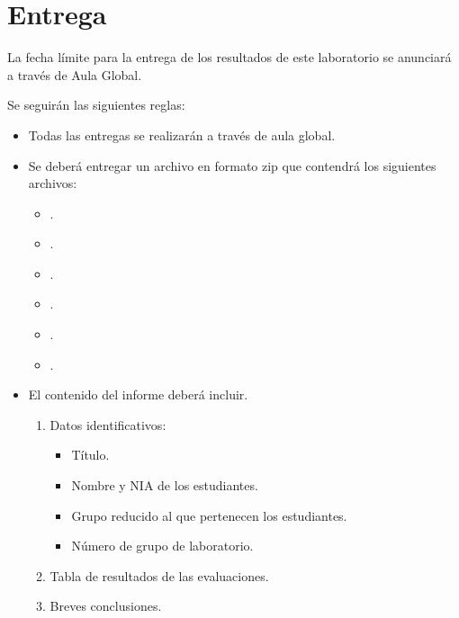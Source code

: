 \clearpage
\section{Entrega}

La fecha límite para la entrega de los resultados de este laboratorio 
se anunciará a través de Aula Global.

Se seguirán las siguientes reglas:

\begin{itemize}

  \item Todas las entregas se realizarán a través de aula global.

  \item Se deberá entregar un archivo en formato zip que contendrá los siguientes archivos:
     \begin{itemize}
       \item {}.
       \item {}.
       \item {}.
       \item {}.
       \item {}.
       \item {}.
     \end{itemize}

  \item El contenido del informe deberá incluir.
  \begin{enumerate}
    \item Datos identificativos:
      \begin{itemize}
        \item Título.
        \item Nombre y NIA de los estudiantes.
        \item Grupo reducido al que pertenecen los estudiantes.
        \item Número de grupo de laboratorio.
      \end{itemize}

    \item Tabla de resultados de las evaluaciones.

    \item Breves conclusiones.

  \end{enumerate}
  
\end{itemize}

